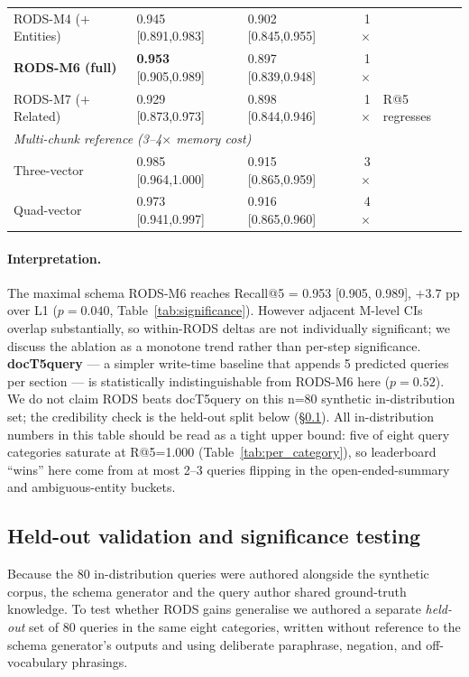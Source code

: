 \documentclass[11pt]{article}
\begin{document}
\begin{table}[t]
\begin{tabular}{lllrl}
RODS-M4 ($+$Entities) & 0.945 [0.891,0.983] & 0.902 [0.845,0.955] & 1$\times$ & \\
\rowcolor{bestcolor!12}
\textbf{RODS-M6 (full)} & \textbf{0.953} [0.905,0.989] & 0.897 [0.839,0.948] & 1$\times$ & \\
RODS-M7 ($+$Related) & 0.929 [0.873,0.973] & 0.898 [0.844,0.946] & 1$\times$ & R@5 regresses \\
\midrule
\multicolumn{5}{l}{\textit{Multi-chunk reference (3--4$\times$ memory cost)}} \\
\midrule
Three-vector      & 0.985 [0.964,1.000] & 0.915 [0.865,0.959] & 3$\times$ & \\
Quad-vector       & 0.973 [0.941,0.997] & 0.916 [0.865,0.960] & 4$\times$ & \\
\bottomrule
\end{tabular}
\end{table}

\paragraph{Interpretation.} The maximal schema RODS-M6 reaches
Recall@5 = 0.953 [0.905, 0.989], $+3.7$ pp over L1
($p{=}0.040$, Table~\ref{tab:significance}). However adjacent
M-level CIs overlap substantially, so within-RODS deltas are not
individually significant; we discuss the ablation as a monotone
trend rather than per-step significance. \textbf{docT5query} ---
a simpler write-time baseline that appends 5 predicted queries per
section --- is statistically indistinguishable from RODS-M6 here
($p{=}0.52$). We do not claim RODS beats docT5query on this n=80
synthetic in-distribution set; the credibility check is the held-out
split below (\S\ref{sec:heldout}). All in-distribution numbers in
this table should be read as a tight upper bound: five of eight
query categories saturate at R@5=1.000 (Table~\ref{tab:per_category}),
so leaderboard ``wins'' here come from at most 2--3 queries flipping
in the open-ended-summary and ambiguous-entity buckets.

\subsection{Held-out validation and significance testing}
\label{sec:heldout}

Because the 80 in-distribution queries were authored alongside the
synthetic corpus, the schema generator and the query author shared
ground-truth knowledge. To test whether RODS gains generalise we
authored a separate \emph{held-out} set of 80 queries in the same
eight categories, written without reference to the schema generator's
outputs and using deliberate paraphrase, negation, and
off-vocabulary phrasings.
\end{document}
